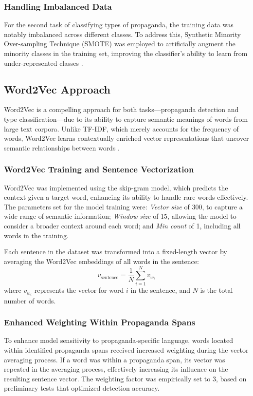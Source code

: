 \documentclass[twocolumn]{article}
\begin{document}
\subsubsection*{Handling Imbalanced Data}
For the second task of classifying types of propaganda, the training data was notably imbalanced across different classes. To address this, Synthetic Minority Over-sampling Technique (SMOTE) was employed to artificially augment the minority classes in the training set, improving the classifier's ability to learn from under-represented classes .


\subsection{{Word2Vec Approach}}
Word2Vec is a compelling approach for both tasks—propaganda detection and type classification—due to its ability to capture semantic meanings of words from large text corpora. Unlike TF-IDF, which merely accounts for the frequency of words, Word2Vec learns contextually enriched vector representations that uncover semantic relationships between words .

\subsubsection*{{Word2Vec Training and Sentence Vectorization}}
Word2Vec was implemented using the skip-gram model, which predicts the context given a target word, enhancing its ability to handle rare words effectively. The parameters set for the model training were:
\textit{Vector size} of 300, to capture a wide range of semantic information;
\textit{Window size} of 15, allowing the model to consider a broader context around each word; and
\textit{Min count} of 1, including all words in the training.

Each sentence in the dataset was transformed into a fixed-length vector by averaging the Word2Vec embeddings of all words in the sentence:
\[ v_{\text{sentence}} = \frac{1}{N} \sum_{i=1}^N v_{w_i} \]
where \( v_{w_i} \) represents the vector for word \( i \) in the sentence, and \( N \) is the total number of words.

\subsubsection*{Enhanced Weighting Within Propaganda Spans}
To enhance model sensitivity to propaganda-specific language, words located within identified propaganda spans received increased weighting during the vector averaging process. If a word was within a propaganda span, its vector was repeated in the averaging process, effectively increasing its influence on the resulting sentence vector. The weighting factor was empirically set to 3, based on preliminary tests that optimized detection accuracy.
\end{document}
